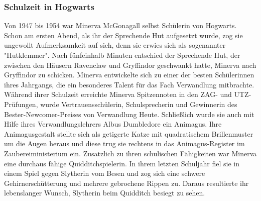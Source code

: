 \documentclass[a4paper, 10pt]{article}
\begin{document}
\subsubsection*{\large Schulzeit in Hogwarts}
Von 1947 bis 1954 war Minerva McGonagall selbst Schülerin von Hogwarts. Schon am ersten Abend, als ihr der Sprechende Hut aufgesetzt wurde, zog sie ungewollt Aufmerksamkeit auf sich, denn sie erwies sich als sogenannter "Hutklemmer". Nach fünfeinhalb Minuten entschied der Sprechende Hut, der zwischen den Häusern Ravenclaw und Gryffindor geschwankt hatte, Minerva nach Gryffindor zu schicken.
\vspace{10pt}
\newline
{}  
Minerva entwickelte sich zu einer der besten Schülerinnen ihres Jahrgangs, die ein besonderes Talent für das Fach Verwandlung mitbrachte. Während ihrer Schulzeit erreichte Minerva Spitzennoten in den ZAG- und UTZ-Prüfungen, wurde Vertrauensschülerin, Schulsprecherin und Gewinnerin des Bester-Newcomer-Preises von Verwandlung Heute. Schließlich wurde sie auch mit Hilfe ihres Verwandlungslehrers Albus Dumbledore ein Animagus. Ihre Animagusgestalt stellte sich als getigerte Katze mit quadratischem Brillenmuster um die Augen heraus und diese trug sie rechtens in das Animagus-Register im Zaubereiministerium ein.
\vspace{10pt}
\newline
{}  
Zusatzlich zu ihren schulischen Fähigkeiten war Minerva eine durchaus fähige Quidditchspielerin. In ihrem letzten Schuljahr fiel sie in einem Spiel gegen Slytherin vom Besen und zog sich eine schwere Gehirnerschütterung und mehrere gebrochene Rippen zu. Daraus resultierte ihr lebenslanger Wunsch, Slytherin beim Quidditch besiegt zu sehen.
\end{document}
